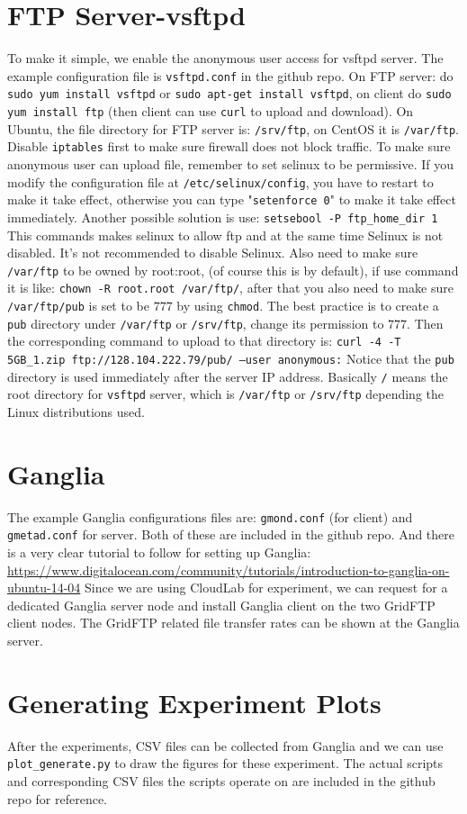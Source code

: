 \documentclass[a4paper]{article}
\begin{document}
\section{FTP Server-vsftpd}
To make it simple, we enable the anonymous user access for vsftpd server. The example configuration file is {\tt vsftpd.conf} in the github repo. On FTP server: do {\tt sudo yum install vsftpd} or {\tt sudo apt-get install vsftpd}, on client do {\tt sudo yum install ftp} (then client can use {\tt curl} to upload and download). On Ubuntu, the file directory for FTP server is: {\tt /srv/ftp}, on CentOS it is {\tt /var/ftp}.\newline \newline
Disable {\tt iptables} first to make sure firewall does not block traffic.\newline \newline
To make sure anonymous user can upload file, remember to set selinux to be permissive. If you modify the configuration file at {\tt /etc/selinux/config}, you have to restart to make it take effect, otherwise you can type "{\tt setenforce 0}" to make it take effect immediately.
Another possible solution is use: {\tt setsebool -P ftp\_home\_dir 1}
This commands makes selinux to allow ftp and at the same time Selinux is not disabled. It's not recommended to disable Selinux.\newline \newline
Also need to make sure {\tt /var/ftp} to be owned by root:root, (of course this is by default), if use command it is like: {\tt chown -R root.root /var/ftp/}, after that you also need to make sure {\tt /var/ftp/pub} is set to be $777$ by using {\tt chmod}.\newline \newline
The best practice is to create a {\tt pub} directory under {\tt /var/ftp} or {\tt /srv/ftp}, change its permission to $777$. Then the corresponding command to upload to that directory is: {\tt curl -4 -T 5GB\_1.zip ftp://128.104.222.79/pub/ --user anonymous:} Notice that the {\tt pub} directory is used immediately after the server IP address. Basically {\tt /} means the root directory for {\tt vsftpd} server, which is {\tt /var/ftp} or {\tt /srv/ftp} depending the Linux distributions used.
\section{Ganglia}
The example Ganglia configurations files are: {\tt gmond.conf} (for client) and {\tt gmetad.conf} for server. Both of these are included in the github repo. And there is a very clear tutorial to follow for setting up Ganglia: \url{ https://www.digitalocean.com/community/tutorials/introduction-to-ganglia-on-ubuntu-14-04}\newline \newline
Since we are using CloudLab for experiment, we can request for a dedicated Ganglia server node and install Ganglia client on the two GridFTP client nodes. The GridFTP related file transfer rates can be shown at the Ganglia server.
\section{Generating Experiment Plots}
After the experiments, CSV files can be collected from Ganglia and we can use {\tt plot\_generate.py} to draw the figures for these experiment. The actual scripts and corresponding CSV files the scripts operate on are included in the github repo for reference.
\end{document}
